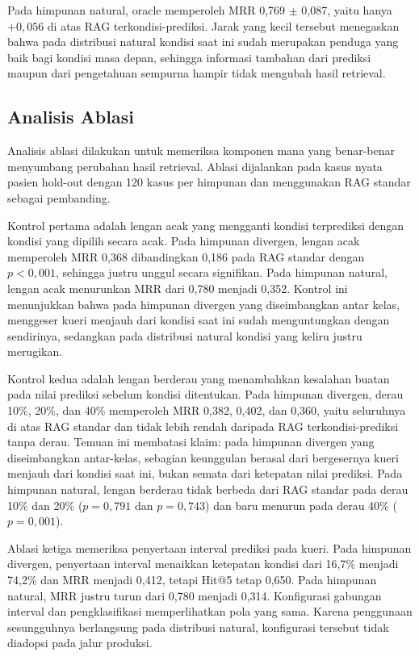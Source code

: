 Pada himpunan natural, oracle memperoleh MRR 0,769 $\pm$ 0,087, yaitu hanya $+0,056$ di atas RAG terkondisi-prediksi. Jarak yang kecil tersebut menegaskan bahwa
pada distribusi natural kondisi saat ini sudah merupakan penduga yang baik bagi kondisi masa depan, sehingga informasi tambahan dari prediksi maupun dari
pengetahuan sempurna hampir tidak mengubah hasil retrieval.

\subsection{Analisis Ablasi}
\label{subsec:bab6-ablation-analysis}

Analisis ablasi dilakukan untuk memeriksa komponen mana yang benar-benar menyumbang perubahan hasil retrieval. Ablasi dijalankan pada kasus nyata pasien hold-out
dengan 120 kasus per himpunan dan menggunakan RAG standar sebagai pembanding.

Kontrol pertama adalah lengan acak yang mengganti kondisi terprediksi dengan kondisi yang dipilih secara acak. Pada himpunan divergen, lengan acak memperoleh MRR
0,368 dibandingkan 0,186 pada RAG standar dengan $p<0,001$, sehingga justru unggul secara signifikan. Pada himpunan natural, lengan acak menurunkan MRR dari 0,780
menjadi 0,352. Kontrol ini menunjukkan bahwa pada himpunan divergen yang diseimbangkan antar kelas, menggeser kueri menjauh dari kondisi saat ini sudah
menguntungkan dengan sendirinya, sedangkan pada distribusi natural kondisi yang keliru justru merugikan.

Kontrol kedua adalah lengan berderau yang menambahkan kesalahan buatan pada nilai prediksi sebelum kondisi ditentukan. Pada himpunan divergen, derau 10\%, 20\%,
dan 40\% memperoleh MRR 0,382, 0,402, dan 0,360, yaitu seluruhnya di atas RAG standar dan tidak lebih rendah daripada RAG terkondisi-prediksi tanpa derau.
Temuan ini membatasi klaim: pada himpunan divergen yang diseimbangkan antar-kelas, sebagian keunggulan berasal dari bergesernya kueri menjauh dari
kondisi saat ini, bukan semata dari ketepatan nilai prediksi. Pada himpunan natural, lengan berderau tidak berbeda dari RAG standar pada
derau 10\% dan 20\% ($p=0,791$ dan $p=0,743$) dan baru menurun pada derau 40\% ($p=0,001$).

Ablasi ketiga memeriksa penyertaan interval prediksi pada kueri. Pada himpunan divergen, penyertaan interval menaikkan ketepatan kondisi dari 16,7\% menjadi
74,2\% dan MRR menjadi 0,412, tetapi Hit@5 tetap 0,650. Pada himpunan natural, MRR justru turun dari 0,780 menjadi 0,314. Konfigurasi gabungan interval dan
pengklasifikasi memperlihatkan pola yang sama. Karena penggunaan sesungguhnya berlangsung pada distribusi natural, konfigurasi tersebut tidak diadopsi pada jalur produksi.

